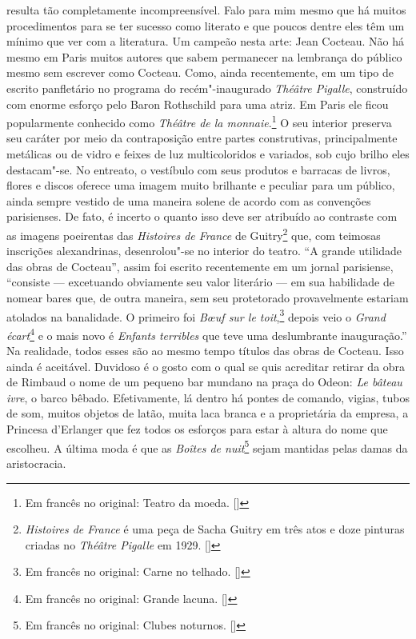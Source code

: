 resulta tão completamente incompreensível. Falo para mim mesmo que há
muitos procedimentos para se ter sucesso como literato e que poucos
dentre eles têm um mínimo que ver com a literatura. Um campeão nesta
arte: Jean Cocteau. Não há mesmo em Paris muitos autores que sabem
permanecer na lembrança do público mesmo sem escrever como Cocteau.
Como, ainda recentemente, em um tipo de escrito panfletário no programa do
recém"-inaugurado \emph{Théâtre Pigalle}, construído com enorme esforço
pelo Baron Rothschild para uma atriz. Em Paris ele ficou popularmente
conhecido como \emph{Théâtre de la monnaie}.\footnote{Em francês no original: Teatro da moeda. []} O seu interior preserva seu caráter
por meio da contraposição entre partes construtivas, principalmente
metálicas ou de vidro e feixes de luz multicoloridos e variados, sob
cujo brilho eles destacam"-se. No entreato, o vestíbulo com seus produtos
e barracas de livros, flores e discos oferece uma imagem muito brilhante
e peculiar para um público, ainda sempre vestido de uma maneira solene
de acordo com as convenções parisienses. De fato, é incerto o quanto
isso deve ser atribuído ao contraste com as imagens poeirentas das
\emph{Histoires de France} de Guitry\footnote{\emph{Histoires de
  France} é uma peça de Sacha Guitry em três atos e doze pinturas
  criadas no \emph{Théâtre Pigalle} em 1929. []} que, com teimosas
inscrições alexandrinas, desenrolou"-se no interior do teatro. ``A grande
utilidade das obras de Cocteau'', assim foi escrito recentemente em um
jornal parisiense, ``consiste --- excetuando obviamente seu valor
literário --- em sua habilidade de nomear bares que, de outra maneira, sem
seu protetorado provavelmente estariam atolados na banalidade. O primeiro foi
\emph{Bœuf sur le toit},\footnote{Em francês no original: Carne no telhado. []} depois veio o \emph{Grand écart}\footnote{Em francês no original: Grande lacuna. []} e o mais novo é
\emph{Enfants terribles} que teve uma deslumbrante inauguração.'' Na
realidade, todos esses são ao mesmo tempo títulos das obras de Cocteau.
Isso ainda é aceitável. Duvidoso é o gosto com o qual se quis acreditar
retirar da obra de Rimbaud o nome de um pequeno bar mundano na praça do
Odeon: \emph{Le bâteau ivre}, o barco bêbado. Efetivamente, lá dentro há
pontes de comando, vigias, tubos de som, muitos objetos de latão, muita
laca branca e a proprietária da empresa, a Princesa d'Erlanger que fez
todos os esforços para estar à altura do nome que escolheu. A última
moda é que as \emph{Boîtes de nuit}\footnote{Em francês no original: Clubes noturnos. []} sejam mantidas pelas damas da aristocracia.
